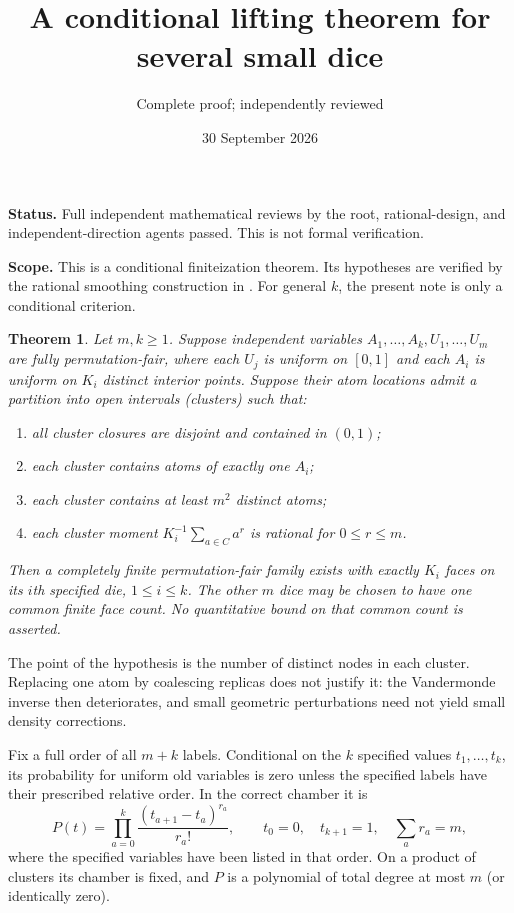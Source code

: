 \documentclass[11pt]{article}
\title{A conditional lifting theorem for several small dice}
\author{Complete proof; independently reviewed}
\date{30 September 2026}
\newtheorem{theorem}{Theorem}
\begin{document}
\maketitle
\noindent\textbf{Status.} Full independent mathematical reviews by the root,
rational-design, and independent-direction agents passed. This is not formal
verification.

\noindent\textbf{Scope.} This is a conditional finiteization theorem.
Its hypotheses are verified by the rational smoothing construction in
. For general $k$, the present
note is only a conditional criterion.

\begin{theorem}\label{main}
Let $m,k\ge1$. Suppose independent variables
$A_1,\ldots,A_k,U_1,\ldots,U_m$ are fully permutation-fair,
where each $U_j$ is uniform on $[0,1]$ and each $A_i$ is uniform on
$K_i$ distinct interior points. Suppose their atom locations admit a
partition into open intervals (clusters) such that:
\begin{enumerate}
\item all cluster closures are disjoint and contained in $(0,1)$;
\item each cluster contains atoms of exactly one $A_i$;
\item each cluster contains at least $m^2$ distinct atoms;
\item each cluster moment $K_i^{-1}\sum_{a\in C}a^r$ is rational
      for $0\le r\le m$.
\end{enumerate}
Then a completely finite permutation-fair family exists with exactly
$K_i$ faces on its $i$th specified die, $1\le i\le k$.
The other $m$ dice may be chosen to have one common finite face count.
No quantitative bound on that common count is asserted.
\end{theorem}

The point of the hypothesis is the number of distinct nodes in each
cluster. Replacing one atom by coalescing replicas does not justify it:
the Vandermonde inverse then deteriorates, and small geometric
perturbations need not yield small density corrections.

Fix a full order of all $m+k$ labels. Conditional on the $k$ specified
values $t_1,\ldots,t_k$, its probability for uniform old variables is
zero unless the specified labels have their prescribed relative order.
In the correct chamber it is
\begin{equation}\label{kernel}
 P(t)=\prod_{a=0}^k\frac{(t_{a+1}-t_a)^{r_a}}{r_a!},
 \qquad t_0=0,\quad t_{k+1}=1,\quad\sum_a r_a=m,
\end{equation}
where the specified variables have been listed in that order.
On a product of clusters its chamber is fixed, and $P$ is a polynomial
of total degree at most $m$ (or identically zero).
\end{document}
